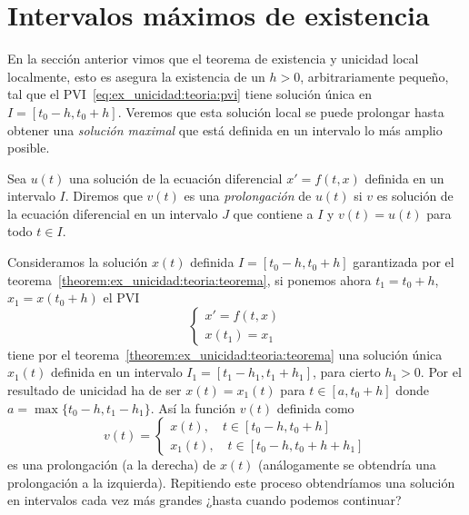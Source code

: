 \documentclass[../ecuaciones_diferenciales.tex]{subfiles}
\begin{document}
\section{Intervalos máximos de existencia}

En la sección anterior vimos que el teorema de existencia y unicidad local localmente, esto es asegura la existencia
de un \(h > 0\), arbitrariamente pequeño, tal que el PVI~\ref{eq:ex_unicidad:teoria:pvi} tiene solución 
única en \(I = [t_0 - h, t_0 + h]\). Veremos que esta solución local se puede prolongar hasta obtener una 
\emph{solución maximal} que está definida en un intervalo lo más amplio posible.

\begin{definition}
    Sea \(u(t)\) una solución de la ecuación diferencial \(x' = f(t, x)\) definida en un intervalo \(I\).
    Diremos que \(v(t)\) es una \emph{prolongación} de \(u(t)\) si \(v\) es solución de la ecuación diferencial
    en un intervalo \(J\) que contiene a \(I\) y \(v(t) = u(t)\) para todo \(t \in I\).
\end{definition}

Consideramos la solución \(x(t)\) definida \(I = [t_0 - h, t_0 + h]\) garantizada por el teorema~\ref{theorem:ex_unicidad:teoria:teorema},
si ponemos ahora \(t_1 = t_0 + h\), \(x_1 = x(t_0 + h)\) el PVI
\[
    \begin{cases}
        x' = f(t, x) \\
        x(t_1) = x_1
    \end{cases}
\]
tiene por el teorema~\ref{theorem:ex_unicidad:teoria:teorema} 
una solución única \(x_1(t)\) definida en un intervalo \(I_1 = [t_1 - h_1, t_1 + h_1]\), para cierto \(h_1 > 0\).
Por el resultado de unicidad ha de ser \(x(t) = x_1(t)\) para \(t \in [a, t_0 + h]\) donde \(a = \max\{t_0 - h, t_1 - h_1\}\).
Así la función \(v(t)\) definida como
\[
    v(t) =
    \begin{cases}
        x(t), \quad t \in [t_0 - h, t_0 + h] \\
        x_1(t), \quad t \in [t_0 - h, t_0 + h + h_1]
    \end{cases}
\]
es una prolongación (a la derecha) de \(x(t)\) (análogamente se obtendría una prolongación a la izquierda).
Repitiendo este proceso obtendríamos una solución en intervalos cada vez más grandes ¿hasta cuando podemos continuar?
\end{document}

